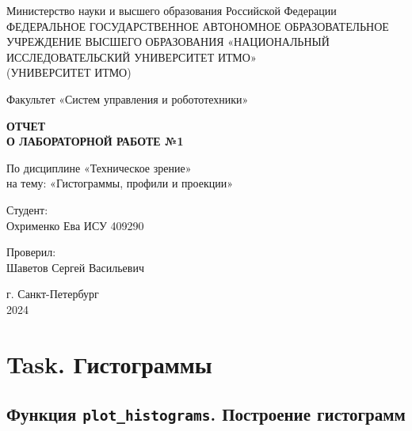 \documentclass[a4paper,12pt]{article}
\begin{document}
\begin{titlepage}
    \centering
    \vspace*{1cm}

    {\large Министерство науки и высшего образования Российской Федерации}\\
    {\large ФЕДЕРАЛЬНОЕ ГОСУДАРСТВЕННОЕ АВТОНОМНОЕ ОБРАЗОВАТЕЛЬНОЕ УЧРЕЖДЕНИЕ ВЫСШЕГО ОБРАЗОВАНИЯ «НАЦИОНАЛЬНЫЙ ИССЛЕДОВАТЕЛЬСКИЙ УНИВЕРСИТЕТ ИТМО»}\\
    {\large (УНИВЕРСИТЕТ ИТМО)}\\

    \vspace{2cm}

    {\large Факультет «Систем управления и робототехники»}\\

    \vspace{3cm}

    \textbf{{\Huge ОТЧЕТ}\\
    {\Huge О ЛАБОРАТОРНОЙ РАБОТЕ №1}}\\

    \vspace{1cm}

    {\LARGE По дисциплине «Техническое зрение»}\\
    {\LARGE на тему: «Гистограммы, профили и проекции»}\\

    \vspace{3cm}

    {\Large Студент:}\\
    Охрименко Ева ИСУ 409290\\


    \vspace{2cm}

    {\Large Проверил:}\\
   Шаветов Сергей Васильевич\\

    \vspace{4cm}

    {\large г. Санкт-Петербург}\\
    {\large 2024}

\end{titlepage}

\tableofcontents  %
\newpage
\section{Task. Гистограммы}

\subsection{Функция \texttt{plot\_histograms}. Построение гистограмм}
\end{document}
